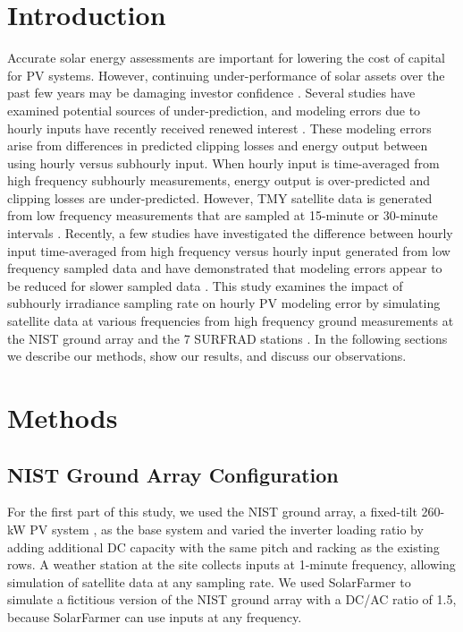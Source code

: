\documentclass[conference]{IEEEtran}
\begin{document}
\section{Introduction}
Accurate solar energy assessments are important for lowering the cost of capital for PV systems. However, continuing under-performance of solar assets over the past few years may be damaging investor confidence \cite{Matsui2021}. Several studies have examined potential sources of under-prediction, and modeling errors due to hourly inputs have recently received renewed interest \cite{Parikh2021,Anderson2020,Bradford2020,Kharait2020,Cormode2019}. These modeling errors arise from differences in predicted clipping losses and energy output between using hourly versus subhourly input. When hourly input is time-averaged from high frequency subhourly measurements, energy output is over-predicted and clipping losses are under-predicted. However, TMY satellite data is generated from low frequency measurements that are sampled at 15-minute or 30-minute intervals \cite{Wilcox2012,Sengupta2018}. Recently, a few studies have investigated the difference between hourly input time-averaged from high frequency versus hourly input generated from low frequency sampled data and have demonstrated that modeling errors appear to be reduced for slower sampled data \cite{Bowersox2021}. This study examines the impact of subhourly irradiance sampling rate on hourly PV modeling error by simulating satellite data at various frequencies from high frequency ground measurements at the NIST ground array \cite{Boyd2017,Boyd2017a,Boyd2017b} and the 7 SURFRAD stations \cite{Augustine2000}. In the following sections we describe our methods, show our results, and discuss our observations.

\section{Methods}

\subsection{NIST Ground Array Configuration}
For the first part of this study, we used the NIST ground array, a fixed-tilt 260-kW PV system \cite{Boyd2017,Boyd2017a,Boyd2017b}, as the base system and varied the inverter loading ratio by adding additional DC capacity with the same pitch and racking as the existing rows. A weather station at the site collects inputs at 1-minute frequency, allowing simulation of satellite data at any sampling rate. We used SolarFarmer \cite{solarfarmer2018} to simulate a fictitious version of the NIST ground array with a DC/AC ratio of 1.5, because SolarFarmer can use inputs at any frequency.
\end{document}

